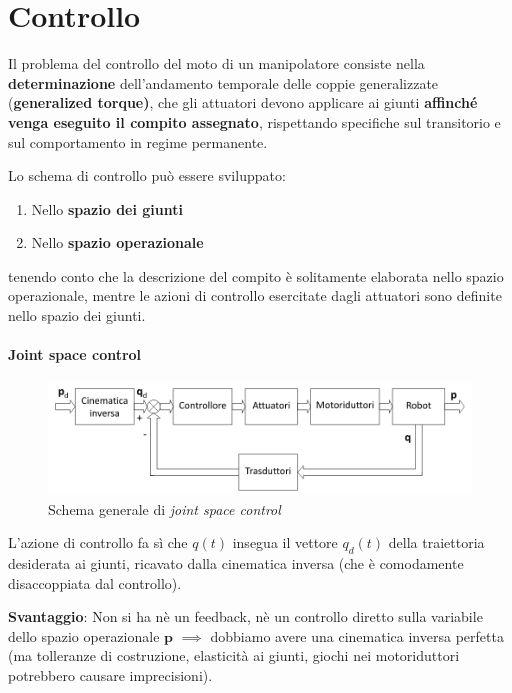 \chapter{Controllo}

Il problema del controllo del moto di un manipolatore consiste nella \textbf{determinazione} dell’andamento temporale delle coppie generalizzate (\textbf{generalized torque)}, che gli attuatori devono applicare ai giunti \textbf{affinché venga eseguito il compito assegnato}, rispettando specifiche sul transitorio e sul comportamento in regime permanente.

Lo schema di controllo può essere sviluppato:
\begin{enumerate}
	\item Nello \textbf{spazio dei giunti}
	\item Nello \textbf{spazio operazionale}
\end{enumerate}

tenendo conto che la descrizione del compito è solitamente elaborata nello spazio operazionale, mentre le azioni di controllo esercitate dagli attuatori sono definite nello spazio dei giunti.\\

\subsubsection{Joint space control}
\begin{figure}[!ht]
	\centering
	\includegraphics[width=0.7\linewidth]{images/joint_control_1}
	\caption{Schema generale di \textit{joint space control}}
	\label{fig:jointcontrol1}
\end{figure}

L’azione di controllo fa sì che $q(t)$ insegua il vettore $q_d(t)$ della traiettoria desiderata ai giunti, ricavato dalla cinematica inversa (che è comodamente disaccoppiata dal controllo).

\textbf{Svantaggio}: Non si ha nè un feedback, nè un controllo diretto sulla variabile dello spazio operazionale $\mathbf{p}$ $\implies$ dobbiamo avere una cinematica inversa perfetta (ma tolleranze di costruzione, elasticità ai giunti, giochi nei motoriduttori potrebbero causare imprecisioni).\\



